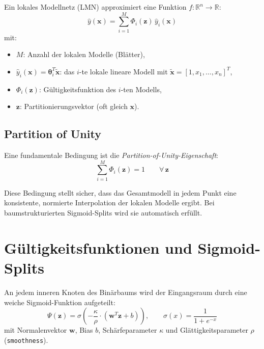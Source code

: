 \documentclass[11pt,a4paper]{report}
\begin{document}
Ein lokales Modellnetz (LMN) approximiert eine Funktion $f: \mathbb{R}^n \to \mathbb{R}$:
\begin{equation}
\hat{y}(\mathbf{x}) = \sum_{i=1}^{M} \Phi_i(\mathbf{z})\,\hat{y}_i(\mathbf{x})
\label{eq:lmn}
\end{equation}
mit:
\begin{itemize}
\item $M$: Anzahl der lokalen Modelle (Bl\"{a}tter),
\item $\hat{y}_i(\mathbf{x}) = \boldsymbol{\theta}_i^T\tilde{\mathbf{x}}$: das $i$-te lokale
      lineare Modell mit $\tilde{\mathbf{x}} = [1, x_1, \ldots, x_n]^T$,
\item $\Phi_i(\mathbf{z})$: G\"{u}ltigkeitsfunktion des $i$-ten Modells,
\item $\mathbf{z}$: Partitionierungsvektor (oft gleich $\mathbf{x}$).
\end{itemize}

\subsection{Partition of Unity}

Eine fundamentale Bedingung ist die \emph{Partition-of-Unity-Eigenschaft}:
\begin{equation}
\sum_{i=1}^{M} \Phi_i(\mathbf{z}) = 1 \qquad \forall\, \mathbf{z}
\label{eq:partition_unity}
\end{equation}

Diese Bedingung stellt sicher, dass das Gesamtmodell in jedem Punkt eine konsistente,
normierte Interpolation der lokalen Modelle ergibt. Bei baumstrukturierten Sigmoid-Splits
wird sie automatisch erf\"{u}llt.

\section{G\"{u}ltigkeitsfunktionen und Sigmoid-Splits}
\label{sec:validity_functions}

An jedem inneren Knoten des Bin\"{a}rbaums wird der Eingangsraum durch eine weiche
Sigmoid-Funktion aufgeteilt:
\begin{equation}
\Psi(\mathbf{z}) = \sigma\!\left(-\frac{\kappa}{\rho} \cdot (\mathbf{w}^T \mathbf{z} + b)\right),
\qquad \sigma(x) = \frac{1}{1+e^{-x}}
\label{eq:sigmoid_split}
\end{equation}
mit Normalenvektor $\mathbf{w}$, Bias $b$, Sch\"{a}rfeparameter $\kappa$ und Gl\"{a}ttigkeitsparameter
$\rho$ (\texttt{smoothness}).
\end{document}
